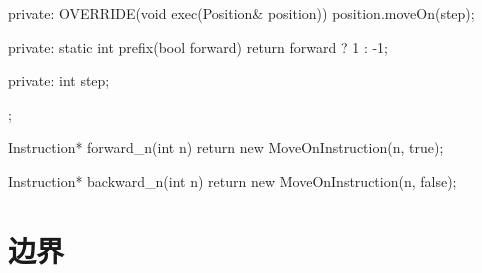 \begin{content}
\begin{leftbar}
\begin{c++}[caption={src/robot-cleaner/Instruction.cpp}]
{{    private:
        OVERRIDE(void exec(Position& position))
        {
            position.moveOn(step);
        }

    private:
        static int prefix(bool forward)
        {
            return forward ? 1 : -1;
        }

    private:
        int step;
    };
}  
  
Instruction* forward_n(int n)
{
    return new MoveOnInstruction(n, true);
}

Instruction* backward_n(int n)
{
    return new MoveOnInstruction(n, false);
}
\end{c++}
\end{leftbar}

\end{content}

\section{边界}

